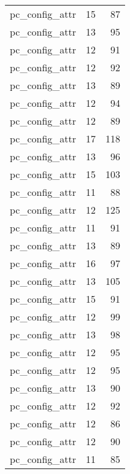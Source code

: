 \begin{table}
\begin{tabular}{lrr}
                  pc\_config\_attr &        15 &        87 \\
                  pc\_config\_attr &        13 &        95 \\
                  pc\_config\_attr &        12 &        91 \\
                  pc\_config\_attr &        12 &        92 \\
                  pc\_config\_attr &        13 &        89 \\
                  pc\_config\_attr &        12 &        94 \\
                  pc\_config\_attr &        12 &        89 \\
                  pc\_config\_attr &        17 &       118 \\
                  pc\_config\_attr &        13 &        96 \\
                  pc\_config\_attr &        15 &       103 \\
                  pc\_config\_attr &        11 &        88 \\
                  pc\_config\_attr &        12 &       125 \\
                  pc\_config\_attr &        11 &        91 \\
                  pc\_config\_attr &        13 &        89 \\
                  pc\_config\_attr &        16 &        97 \\
                  pc\_config\_attr &        13 &       105 \\
                  pc\_config\_attr &        15 &        91 \\
                  pc\_config\_attr &        12 &        99 \\
                  pc\_config\_attr &        13 &        98 \\
                  pc\_config\_attr &        12 &        95 \\
                  pc\_config\_attr &        12 &        95 \\
                  pc\_config\_attr &        13 &        90 \\
                  pc\_config\_attr &        12 &        92 \\
                  pc\_config\_attr &        12 &        86 \\
                  pc\_config\_attr &        12 &        90 \\
                  pc\_config\_attr &        11 &        85 \\

\end{tabular}
\end{table}
